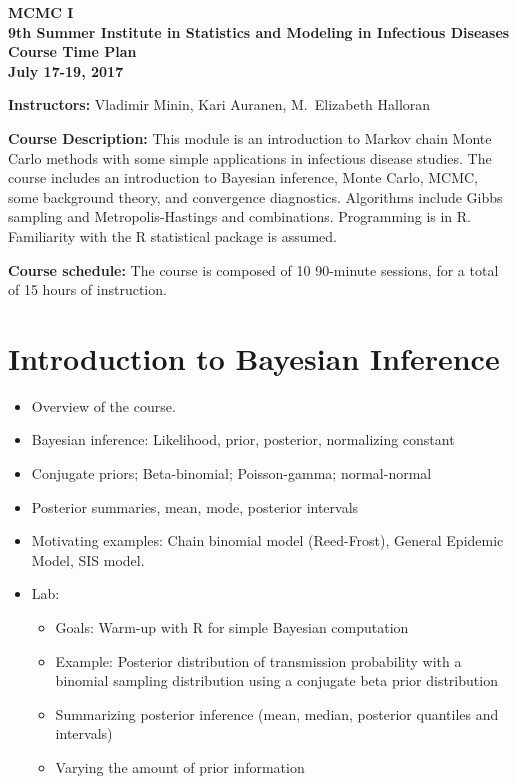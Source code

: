 \documentclass[11pt]{article}
\begin{document}

\addtolength{\baselineskip}{0.0\baselineskip}  
\pagestyle{myheadings} 

\begin{center}
{\bf  MCMC I \\
9th Summer Institute in Statistics and Modeling in Infectious Diseases \\
 Course Time Plan  \\
July 17-19, 2017}  
\end{center}

\vspace{.2cm}

\noindent
 {\bf Instructors:} Vladimir Minin,  Kari Auranen, M.\ Elizabeth Halloran\\

\vspace{.3cm}

\noindent
{\bf Course Description:} This module is an introduction to Markov chain Monte Carlo methods with some simple applications in infectious disease 
studies.  
 The course includes an introduction to 
 Bayesian inference, Monte Carlo, MCMC, some background theory, and convergence diagnostics. Algorithms include Gibbs sampling and Metropolis-Hastings and combinations. Programming is in R. 
 Familiarity with the R statistical package is assumed. 



\noindent
{\bf Course schedule:}
The course is composed of 10 90-minute sessions, for a total of 15 hours of instruction. 


\section{Introduction to Bayesian Inference} 
\begin{itemize} 
\item Overview of the course. 
\item Bayesian inference: Likelihood, prior, posterior, normalizing constant  
\item Conjugate priors; Beta-binomial; Poisson-gamma; normal-normal 
\item Posterior summaries, mean, mode,  posterior intervals   
\item Motivating examples: Chain binomial model (Reed-Frost), General Epidemic Model,  
SIS model.
\item {Lab: }
\begin{itemize}
\item Goals:  Warm-up with R for simple Bayesian computation
\item  Example: Posterior distribution of transmission probability with a binomial  sampling distribution using a conjugate beta prior distribution
\item Summarizing posterior inference (mean, median, posterior quantiles and intervals)
\item Varying the amount of prior information
\end{itemize}
\end{itemize}
\end{document}

